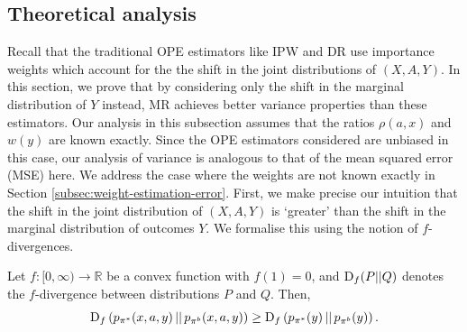 \subsection{Theoretical analysis}\label{subsec:comparison}
Recall that the traditional OPE estimators like IPW and DR use importance weights which account for the the shift in the joint distributions of $(X, A, Y)$. In this section, we prove that by considering only the shift in the marginal distribution of $Y$ instead, MR achieves better variance properties than these estimators.
Our analysis in this subsection assumes that the ratios $\rho(a, x)$ and $w(y)$ are known exactly. Since the OPE estimators considered are unbiased in this case, 
our analysis of variance is analogous to that of the mean squared error (MSE) here.
We address the case where the weights are not known exactly in Section \ref{subsec:weight-estimation-error}.
First, we make precise our intuition that the shift in the joint distribution of $(X, A, Y)$ is `greater' than the shift in the marginal distribution of outcomes $Y$. 
We formalise this using the notion of $f$-divergences.
\begin{proposition}\label{tv_prop}
Let $f:[0, \infty) \rightarrow \mathbb{R}$ be a convex function with $f(1)=0$, and $\textup{D}_f(P || Q)$ denotes the $f$-divergence between distributions $P$ and $Q$. Then,
\[
\textup{D}_f\left(p_{\pi^*}(x,a,y)\,||\, p_{\pi^b}(x,a,y)\right) \geq \textup{D}_f\left(p_{\pi^*}(y)\,||\, p_{\pi^b}(y)\right).
\]
\end{proposition}

